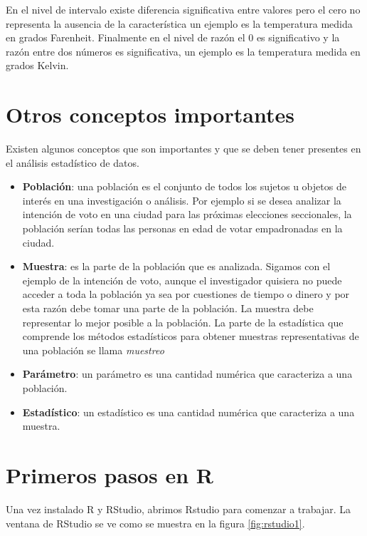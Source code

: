 \documentclass[]{book}
\providecommand{\tightlist}{%
  \setlength{\itemsep}{0pt}\setlength{\parskip}{0pt}}
\begin{document}
En el nivel de intervalo existe diferencia significativa entre valores
pero el cero no representa la ausencia de la característica un ejemplo
es la temperatura medida en grados Farenheit. Finalmente en el nivel de
razón el 0 es significativo y la razón entre dos números es
significativa, un ejemplo es la temperatura medida en grados Kelvin.

\section{Otros conceptos importantes}\label{otros-conceptos-importantes}

Existen algunos conceptos que son importantes y que se deben tener
presentes en el análisis estadístico de datos.

\begin{itemize}
\tightlist
\item
  \textbf{Población}: una población es el conjunto de todos los sujetos
  u objetos de interés en una investigación o análisis. Por ejemplo si
  se desea analizar la intención de voto en una ciudad para las próximas
  elecciones seccionales, la población serían todas las personas en edad
  de votar empadronadas en la ciudad.
\item
  \textbf{Muestra}: es la parte de la población que es analizada.
  Sigamos con el ejemplo de la intención de voto, aunque el investigador
  quisiera no puede acceder a toda la población ya sea por cuestiones de
  tiempo o dinero y por esta razón debe tomar una parte de la población.
  La muestra debe representar lo mejor posible a la población. La parte
  de la estadística que comprende los métodos estadísticos para obtener
  muestras representativas de una población se llama \emph{muestreo}
\item
  \textbf{Parámetro}: un parámetro es una cantidad numérica que
  caracteriza a una población.
\item
  \textbf{Estadístico}: un estadístico es una cantidad numérica que
  caracteriza a una muestra.
\end{itemize}

\section{Primeros pasos en R}\label{primerR}

Una vez instalado R y RStudio, abrimos Rstudio para comenzar a trabajar.
La ventana de RStudio se ve como se muestra en la figura
\ref{fig:rstudio1}.
\end{document}
